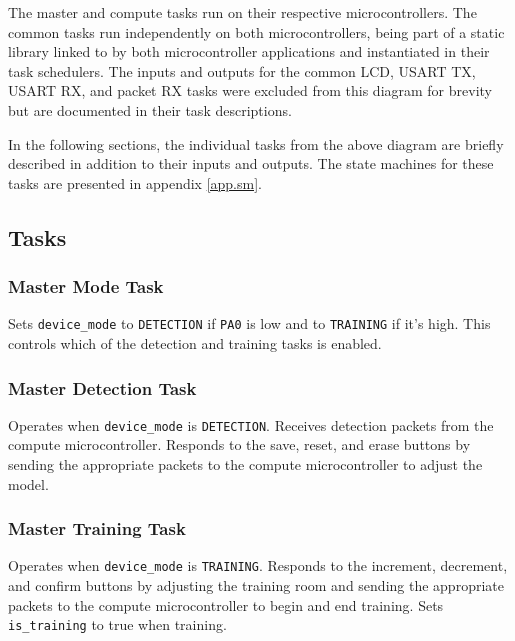 \documentclass{article}
\begin{document}
The master and compute tasks run on their respective microcontrollers.
The common tasks run independently on both microcontrollers, being part
of a static library linked to by both microcontroller applications and
instantiated in their task schedulers.  The inputs and outputs for the
common LCD, USART TX, USART RX, and packet RX tasks were excluded from
this diagram for brevity but are documented in their task descriptions.

In the following sections, the individual tasks from the above diagram
are briefly described in addition to their inputs and outputs.  The
state machines for these tasks are presented in appendix \ref{app.sm}.

\subsection{Tasks}

\toggletrue{TASKSPECONLY}

\subsubsection{Master Mode Task}


Sets \verb#device_mode# to \verb#DETECTION# if \verb#PA0# is low and to
\verb#TRAINING# if it's high.  This controls which of the detection and
training tasks is enabled.

\subsubsection{Master Detection Task}


Operates when \verb#device_mode# is \verb#DETECTION#.  Receives
detection packets from the compute microcontroller.  Responds to the
save, reset, and erase buttons by sending the appropriate packets to the
compute microcontroller to adjust the model.

\subsubsection{Master Training Task}


Operates when \verb#device_mode# is \verb#TRAINING#.  Responds to the
increment, decrement, and confirm buttons by adjusting the training room
and sending the appropriate packets to the compute microcontroller to
begin and end training.  Sets \verb#is_training# to true when training.
\end{document}

